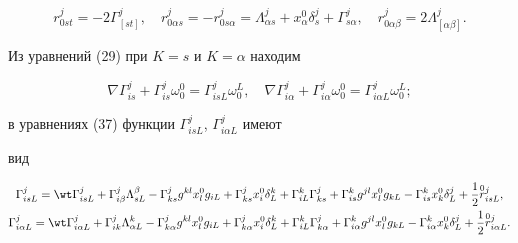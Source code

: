 \begin{equation} 


r^j_{0s t}=-2\Gamma^j_{[s t]},\quad r^j_{0\alpha s}= 


-r^j_{0s\alpha}=\Lambda^j_{\alpha s}+x^0_\alpha \delta^j_s+ 


\Gamma^j_{s\alpha},\quad r^j_{0\alpha\beta}= 


2\Lambda^j_{[\alpha\beta]}. 


\end{equation} 


Из уравнений (29) при $K=s$ и $K=\alpha$ находим 


\begin{equation} 


\nabla\Gamma^j_{is}+\Gamma^j_{is}\omega^0_0= 


\Gamma^j_{is L}\omega^L_0,\quad 


\nabla\Gamma^j_{i\alpha}+\Gamma^j_{i\alpha}\omega^0_0= 


\Gamma^j_{i\alpha L}\omega^L_0; 


\end{equation} 


в уравнениях (37) функции $\Gamma^j_{is L}$, $\Gamma^j_{i\alpha L}$ имеют 


вид 


\begin{gather} 


\Gamma^j_{is L}=\wt\Gamma^j_{is L}+\Gamma^j_{i\beta} 


\Lambda^\beta_{s L}-\Gamma^j_{k s}g^{k l}x^0_l g_{i L} 


+\Gamma^j_{k s}x^0_i \delta^k_L+\Gamma^k_{i L}\Gamma^j_{k s} 


+\Gamma^k_{is}g^{j l}x^0_l g_{k L}-\Gamma^k_{is} 


x^0_k \delta^j_L+\frac{1}{2}\up{0}{r}^j_{is L},\\ 


% 


\Gamma^j_{i\alpha L}=\wt\Gamma^j_{i\alpha L}+ 


\Gamma^j_{i k}\Lambda^k_{\alpha L}-\Gamma^j_{k\alpha} 


g^{k l}x^0_l g_{i L}+\Gamma^j_{k\alpha}x^0_i \delta^k_L+ 


\Gamma^k_{i L}\Gamma^j_{k\alpha}+\Gamma^k_{i\alpha} 


g^{j l}x^0_l g_{k L}-\Gamma^k_{i\alpha}x^0_k \delta^j_L+ 


\frac{1}{2}\up{0}{r}^j_{i\alpha L}. 


\end{gather} 


